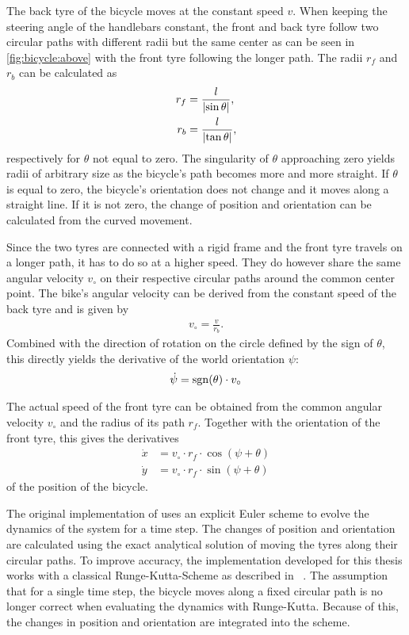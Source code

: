 The back tyre of the bicycle moves at the constant speed $v$.
When keeping the steering angle of the handlebars constant, the front and back tyre follow two circular paths with different radii but the same center as can be seen in \cref{fig:bicycle:above} with the front tyre following the longer path.
The radii $r_f$ and $r_b$ can be calculated as
\begin{align}
    r_f &= \frac{l}{\abs*{\sin \theta}}, \\
    r_b &= \frac{l}{\abs*{\tan \theta}},
\end{align}
respectively for $\theta$ not equal to zero.
The singularity of $\theta$ approaching zero yields radii of arbitrary size as the bicycle's path becomes more and more straight.
If $\theta$ is equal to zero, the bicycle's orientation does not change and it moves along a straight line.
If it is not zero, the change of position and orientation can be calculated from the curved movement.

Since the two tyres are connected with a rigid frame and the front tyre travels on a longer path, it has to do so at a higher speed.
They do however share the same angular velocity $v_\circ$ on their respective circular paths around the common center point.
The bike's angular velocity can be derived from the constant speed of the back tyre and is given by
\begin{align}
    v_\circ = \frac{v}{r_b}.
\end{align}
Combined with the direction of rotation on the circle defined by the sign of $\theta$, this directly yields the derivative of the world orientation $\psi$:
\begin{align}
    \label{eq:psi_dot}
    \dot{\psi} = \sgn(\theta) \cdot v_\circ
\end{align}

The actual speed of the front tyre can be obtained from the common angular velocity $v_\circ$ and the radius of its path $r_f$.
Together with the orientation of the front tyre, this gives the derivatives
\begin{align}
    \label{eq:x_dot}
    \dot{x} &= v_\circ \cdot r_f \cdot \cos(\psi + \theta) \\
    \label{eq:y_dot}
    \dot{y} &= v_\circ \cdot r_f \cdot \sin(\psi + \theta)
\end{align}
of the position of the bicycle.

The original implementation of \citeauthor{randlov_learning_1998} uses an explicit Euler scheme to evolve the dynamics of the system for a time step.
The changes of position and orientation are calculated using the exact analytical solution of moving the tyres along their circular paths.
To improve accuracy, the implementation developed for this thesis works with a classical Runge-Kutta-Scheme as described in ~\cite{press_numerical_2007}.
The assumption that for a single time step, the bicycle moves along a fixed circular path is no longer correct when evaluating the dynamics with Runge-Kutta.
Because of this, the changes in position and orientation are integrated into the scheme.


